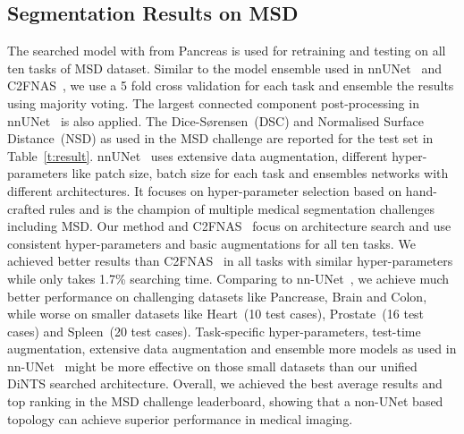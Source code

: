 \documentclass[final]{cvpr}
\begin{document}
\subsection{Segmentation Results on MSD} 
\label{sec:test-result}
The searched model with  from Pancreas is used for retraining and testing on all ten tasks of MSD dataset. Similar to the model ensemble used in nnUNet~\cite{isensee2019nnunet} and C2FNAS~\cite{yu2020c2fnas}, we use a 5 fold cross validation for each task and ensemble the results using majority voting. The largest connected component post-processing in nnUNet~\cite{isensee2019nnunet} is also applied. The Dice-Sørensen~(DSC) and Normalised Surface Distance~(NSD) as used in the MSD challenge are reported for the test set in Table~\ref{t:result}. nnUNet~\cite{isensee2019nnunet} uses extensive data augmentation, different hyper-parameters like patch size, batch size for each task and ensembles networks with different architectures. It focuses on hyper-parameter selection based on hand-crafted rules and is the champion of multiple medical segmentation challenges including MSD. Our method and C2FNAS~\cite{yu2020c2fnas} focus on architecture search and use consistent hyper-parameters and basic augmentations for all ten tasks. We achieved better results than C2FNAS~\cite{yu2020c2fnas} in all tasks with similar hyper-parameters while only takes 1.7\% searching time. Comparing to nn-UNet~\cite{isensee2019nnunet}, we achieve much better performance on challenging datasets like Pancrease, Brain and Colon, while worse on smaller datasets like Heart~(10 test cases), Prostate~(16 test cases) and Spleen~(20 test cases). Task-specific hyper-parameters, test-time augmentation, extensive data augmentation and ensemble more models as used in nn-UNet~\cite{isensee2019nnunet} might be more effective on those small datasets than our unified DiNTS searched architecture. Overall, we achieved the best average results and top ranking in the MSD challenge leaderboard, showing that a non-UNet based topology can achieve superior performance in medical imaging. 
\end{document}
